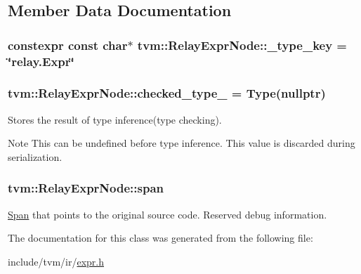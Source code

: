 \subsection{Member Data Documentation}
\subsubsection[{\texorpdfstring{\+\_\+type\+\_\+key}{_type_key}}]{\setlength{\rightskip}{0pt plus 5cm}constexpr const char$\ast$ tvm\+::\+Relay\+Expr\+Node\+::\+\_\+type\+\_\+key = \char`\"{}relay.\+Expr\char`\"{}\hspace{0.3cm}{\ttfamily [static]}}\hypertarget{classtvm_1_1RelayExprNode_af3b9138611995c37d266f0f977f8eb1b}{}\label{classtvm_1_1RelayExprNode_af3b9138611995c37d266f0f977f8eb1b}
\subsubsection[{\texorpdfstring{checked\+\_\+type\+\_\+}{checked_type_}}]{ tvm\+::\+Relay\+Expr\+Node\+::checked\+\_\+type\+\_\+ = {\bf Type}(nullptr)\hspace{0.3cm}{\ttfamily [mutable]}}\hypertarget{classtvm_1_1RelayExprNode_ae30ca49a8b84288fbc21d5f312f02929}{}\label{classtvm_1_1RelayExprNode_ae30ca49a8b84288fbc21d5f312f02929}


Stores the result of type inference(type checking). 

\begin{DoxyNote}{Note}
This can be undefined before type inference. This value is discarded during serialization. 
\end{DoxyNote}
\subsubsection[{\texorpdfstring{span}{span}}]{ tvm\+::\+Relay\+Expr\+Node\+::span\hspace{0.3cm}{\ttfamily [mutable]}}\hypertarget{classtvm_1_1RelayExprNode_a904ae50be0b72eab079bed93829c9563}{}\label{classtvm_1_1RelayExprNode_a904ae50be0b72eab079bed93829c9563}


\hyperlink{classtvm_1_1Span}{Span} that points to the original source code. Reserved debug information. 



The documentation for this class was generated from the following file\+:\begin{DoxyCompactItemize}
\item 
include/tvm/ir/\hyperlink{ir_2expr_8h}{expr.\+h}\end{DoxyCompactItemize}
